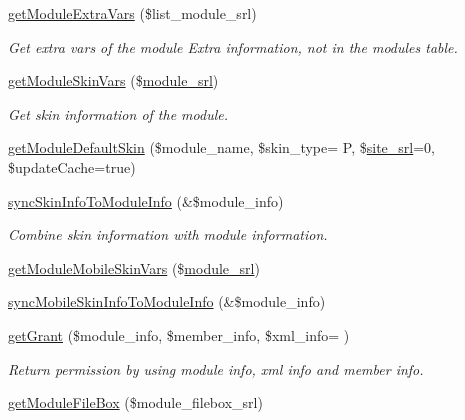 \begin{DoxyCompactItemize}
\hyperlink{classmoduleModel_a4e93226573048a7b9c8e2cb842d0cb30}{get\+Module\+Extra\+Vars} (\$list\+\_\+module\+\_\+srl)
\begin{DoxyCompactList}\small\item\em Get extra vars of the module Extra information, not in the modules table. \end{DoxyCompactList}\item 
\hyperlink{classmoduleModel_aa3828c94af2b1c8b84fafd423038445d}{get\+Module\+Skin\+Vars} (\$\hyperlink{ko_8install_8php_a370bb6450fab1da3e0ed9f484a38b761}{module\+\_\+srl})
\begin{DoxyCompactList}\small\item\em Get skin information of the module. \end{DoxyCompactList}\item 
\hyperlink{classmoduleModel_a0a77bcbc85aa39eebe18687ab6e0b974}{get\+Module\+Default\+Skin} (\$module\+\_\+name, \$skin\+\_\+type= \textquotesingle{}P\textquotesingle{}, \$\hyperlink{ko_8install_8php_a8b1406b4ad1048041558dce6bfe89004}{site\+\_\+srl}=0, \$update\+Cache=true)
\item 
\hyperlink{classmoduleModel_af9179765de4796b45236b62be16eb8fb}{sync\+Skin\+Info\+To\+Module\+Info} (\&\$module\+\_\+info)
\begin{DoxyCompactList}\small\item\em Combine skin information with module information. \end{DoxyCompactList}\item 
\hyperlink{classmoduleModel_aef7f4760b4c1864752d1042e1a0667c8}{get\+Module\+Mobile\+Skin\+Vars} (\$\hyperlink{ko_8install_8php_a370bb6450fab1da3e0ed9f484a38b761}{module\+\_\+srl})
\item 
\hyperlink{classmoduleModel_ae90cd832480cf8c46e96d95c20a63387}{sync\+Mobile\+Skin\+Info\+To\+Module\+Info} (\&\$module\+\_\+info)
\item 
\hyperlink{classmoduleModel_a0d6431efeb3e3d377dbbb20b414ba074}{get\+Grant} (\$module\+\_\+info, \$member\+\_\+info, \$xml\+\_\+info= \textquotesingle{}\textquotesingle{})
\begin{DoxyCompactList}\small\item\em Return permission by using module info, xml info and member info. \end{DoxyCompactList}\item 
\hyperlink{classmoduleModel_a792e14b71d66044513a646a44216be17}{get\+Module\+File\+Box} (\$module\+\_\+filebox\+\_\+srl)
\item 

\end{DoxyCompactItemize}
